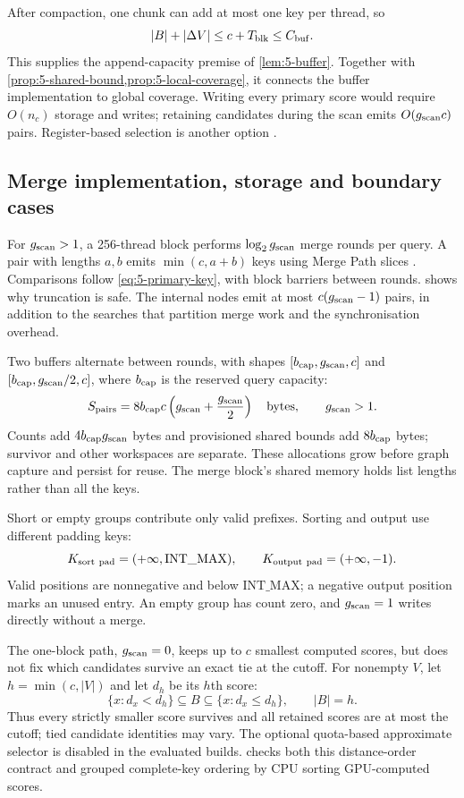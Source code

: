 After compaction, one chunk can add at most one key per thread, so
\[
 |B|+|\Delta V|\leq c+T_{\rm blk}\leq C_{\rm buf}.
\]
This supplies the append-capacity premise of \cref{lem:5-buffer}.
Together with \cref{prop:5-shared-bound,prop:5-local-coverage}, it connects
the buffer implementation to global coverage. Writing every primary
score would require $O(n_c)$ storage and writes; retaining candidates
during the scan emits $O(g_{\mathrm{scan}} c)$ pairs. Register-based selection is
another option \cite{johnson_gpu}.

\subsection{Merge implementation, storage and boundary cases}

For $g_{\mathrm{scan}}>1$, a 256-thread block performs $\log_2g_{\mathrm{scan}}$ merge rounds
per query. A pair with lengths $a,b$ emits $\min(c,a+b)$ keys using
Merge Path slices \cite{gpu_merge_path}. Comparisons follow
\cref{eq:5-primary-key}, with block barriers between rounds.
 shows why truncation is safe. The internal
nodes emit at most $c(g_{\mathrm{scan}}-1)$ pairs, in addition to the searches that
partition merge work and the synchronisation overhead.

Two buffers alternate between rounds, with shapes
$[b_{\rm cap},g_{\mathrm{scan}},c]$ and $[b_{\rm cap},g_{\mathrm{scan}}/2,c]$, where
$b_{\rm cap}$ is the reserved query capacity:
\begin{equation}
 S_{\rm pairs}=8b_{\rm cap}c\left(g_{\mathrm{scan}}+\frac{g_{\mathrm{scan}}}{2}\right)
 \quad\text{bytes},\qquad g_{\mathrm{scan}}>1.
 \label{eq:5-group-workspace}
\end{equation}
Counts add $4b_{\rm cap}g_{\mathrm{scan}}$ bytes and provisioned shared bounds add
$8b_{\rm cap}$ bytes; survivor and other workspaces are separate. These
allocations grow before graph capture and persist for reuse. The merge
block's shared memory holds list lengths rather than all the keys.

Short or empty groups contribute only valid prefixes. Sorting and output
use different padding keys:
\[
 K_{\rm sort\ pad}=(+\infty,\mathrm{INT\_MAX}),\qquad
 K_{\rm output\ pad}=(+\infty,-1).
\]
Valid positions are nonnegative and below $\mathrm{INT\_MAX}$; a negative
output position marks an unused entry. An empty group has count zero,
and $g_{\mathrm{scan}}=1$ writes directly without a merge.

The one-block path, $g_{\mathrm{scan}}=0$, keeps up to $c$ smallest computed scores,
but does not fix which candidates survive an exact tie at the cutoff.
For nonempty $V$, let $h=\min(c,|V|)$ and let $d_h$ be its $h$th score:
\[
 \{x:d_x<d_h\}\subseteq B\subseteq\{x:d_x\leq d_h\},\qquad |B|=h.
\]
Thus every strictly smaller score survives and all retained scores are
at most the cutoff; tied candidate identities may vary. The optional
quota-based approximate selector is disabled in the evaluated builds.
 checks both this distance-order contract
and grouped complete-key ordering by CPU sorting GPU-computed scores.
